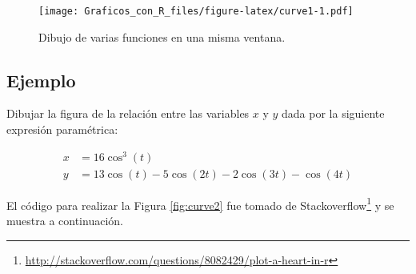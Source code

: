 \documentclass[10pt,]{krantz}
\makeatletter
\newenvironment{Shaded}{\begin{snugshade}}{\end{snugshade}}
\newcommand{\KeywordTok}[1]{\textcolor[rgb]{0.13,0.29,0.53}{\textbf{#1}}}
\newcommand{\DataTypeTok}[1]{\textcolor[rgb]{0.13,0.29,0.53}{#1}}
\newcommand{\DecValTok}[1]{\textcolor[rgb]{0.00,0.00,0.81}{#1}}
\newcommand{\FloatTok}[1]{\textcolor[rgb]{0.00,0.00,0.81}{#1}}
\newcommand{\StringTok}[1]{\textcolor[rgb]{0.31,0.60,0.02}{#1}}
\newcommand{\ControlFlowTok}[1]{\textcolor[rgb]{0.13,0.29,0.53}{\textbf{#1}}}
\newcommand{\OperatorTok}[1]{\textcolor[rgb]{0.81,0.36,0.00}{\textbf{#1}}}
\newcommand{\NormalTok}[1]{#1}
\renewcommand{\href}[2]{#2\footnote{\url{#1}}}
\newenvironment{kframe}{%
\medskip{}
\setlength{\fboxsep}{.8em}
 \def\at@end@of@kframe{}%
 \ifinner\ifhmode%
  \def\at@end@of@kframe{\end{minipage}}%
  \begin{minipage}{\columnwidth}%
 \fi\fi%
 \def\FrameCommand##1{\hskip\@totalleftmargin \hskip-\fboxsep
 \colorbox{shadecolor}{##1}\hskip-\fboxsep
     \hskip-\linewidth \hskip-\@totalleftmargin \hskip\columnwidth}%
 \MakeFramed {\advance\hsize-\width
   \@totalleftmargin\z@ \linewidth\hsize
   \@setminipage}}%
 {\par\unskip\endMakeFramed%
 \at@end@of@kframe}
\renewenvironment{Shaded}{\begin{kframe}}{\end{kframe}}
\makeatother
\begin{document}
\begin{figure}
\centering
\texttt{[image: Graficos\_con\_R\_files/figure-latex/curve1-1.pdf]}
\caption{\label{fig:curve1}Dibujo de varias funciones en una misma ventana.}
\end{figure}

\subsection*{Ejemplo}\label{ejemplo-42}


Dibujar la figura de la relación entre las variables \(x\) y \(y\) dada
por la siguiente expresión paramétrica:

\begin{align}
x &= 16 \cos^3(t) \\
y &= 13 \cos(t)-5 \cos(2t)-2 \cos(3t)- \cos(4t)
\end{align}

El código para realizar la Figura \ref{fig:curve2} fue tomado de
\href{http://stackoverflow.com/questions/8082429/plot-a-heart-in-r}{Stackoverflow}
y se muestra a continuación.

\begin{Shaded}
\end{Shaded}
\end{document}
